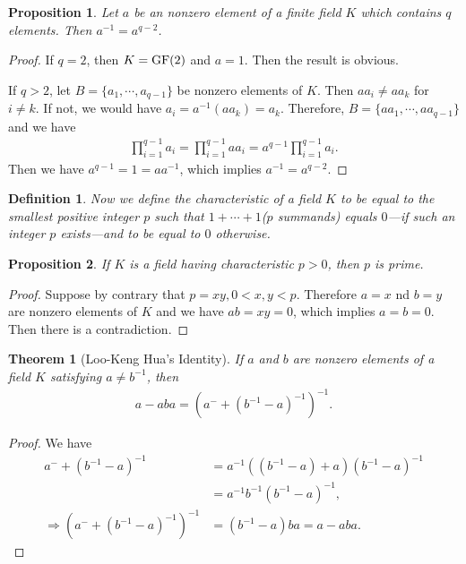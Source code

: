 \documentclass[10pt]{book}
\newtheorem{definition}{Definition}[chapter]
\newtheorem{theorem}{Theorem}[chapter]
\newtheorem{proposition}{Proposition}[chapter]
\theoremstyle{definition}
\numberwithin{equation}{chapter}
\begin{document}
\begin{proposition}
Let $a$ be an nonzero element of a finite field $K$ which contains $q$ elements. Then $a^{-1} = a^{q-2}$.
\end{proposition}
\begin{proof}
If $q = 2$, then $K = {\rm GF}(2)$ and $a = 1$. Then the result is obvious. 

If $q > 2$, let $B = \{a_1, \cdots, a_{q-1}\}$ be nonzero elements of $K$. Then $aa_i\neq aa_k$ for $i\neq k$. If not, we would have $a_i = a^{-1}(aa_k) = a_k$. Therefore, $B = \{a a_1, \cdots, a a_{q-1}\}$ and we have 
\begin{align*}
    \prod^{q-1}_{i=1}a_i = \prod^{q-1}_{i=1}aa_i = a^{q-1}\prod^{q-1}_{i=1}a_i.
\end{align*}
Then we have $a^{q-1} = 1 = a a^{-1}$, which implies $a^{-1} = a^{q-2}$.
\end{proof}

\medskip
\begin{definition}
Now we define the characteristic of a field $K$ to be equal to the smallest positive integer $p$ such that $1+\cdots+1$($p$ summands) equals $0$—if such an integer $p$ exists—and to be equal to $0$ otherwise.
\end{definition}

\medskip

\begin{proposition}
If $K$ is a field having characteristic $p > 0$, then $p$ is prime.
\end{proposition}
\begin{proof}
Suppose by contrary that $p = xy, 0<x,y<p$. Therefore $a = x$ nd $b = y$ are nonzero elements of $K$ and we have $ab = xy = 0$, which implies $a=b=0$. Then there is a contradiction. 
\end{proof}

\medskip

\begin{theorem}[Loo-Keng Hua's Identity]
If $a$ and $b$ are nonzero elements of a field $K$ satisfying $a\neq b^{-1}$, then
\begin{align*}
    a - aba = \left(a^{-} + (b^{-1} - a)^{-1}\right)^{-1}.
\end{align*}
\end{theorem}
\begin{proof}
We have
\begin{align*}
    a^{-} + (b^{-1} - a)^{-1} & = a^{-1}\left((b^{-1} - a) + a \right)(b^{-1} - a)^{-1}\\
    & = a^{-1}b^{-1}(b^{-1} - a)^{-1}, \\
    \Rightarrow \left(a^{-} + (b^{-1} - a)^{-1}\right)^{-1} & = (b^{-1} - a)ba = a - aba.
\end{align*}
\end{proof}
\end{document}
